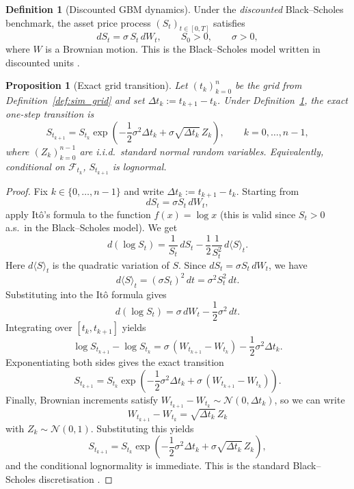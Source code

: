 \documentclass[12pt,a4paper]{article}
\theoremstyle{definition}
\newtheorem{definition}{Definition}[section]
\theoremstyle{plain}
\newtheorem{proposition}{Proposition}[section]
\theoremstyle{remark}
\theoremstyle{plain}
\begin{document}
\begin{definition}[Discounted GBM dynamics]
\label{def:gbm_discounted}
Under the \emph{discounted} Black--Scholes benchmark, the asset price process $(S_t)_{t\in[0,T]}$ satisfies
\[
dS_t = \sigma\, S_t\, dW_t,
\qquad S_0>0,
\qquad \sigma>0,
\]
where $W$ is a Brownian motion. This is the Black--Scholes model written in discounted units \cite{BlackScholes1973}.
\end{definition}

\begin{proposition}[Exact grid transition]
\label{prop:gbm_exact_transition}
Let $(t_k)_{k=0}^n$ be the grid from Definition~\ref{def:sim_grid} and set $\Delta t_k:=t_{k+1}-t_k$. 
Under Definition~\ref{def:gbm_discounted}, the exact one-step transition is
\[
S_{t_{k+1}}
=
S_{t_k}\exp\!\left(-\frac{1}{2}\sigma^2\Delta t_k+\sigma\sqrt{\Delta t_k}\,Z_k\right),
\qquad k=0,\dots,n-1,
\]
where $(Z_k)_{k=0}^{n-1}$ are i.i.d.\ standard normal random variables.
Equivalently, conditional on $\mathcal{F}_{t_k}$, $S_{t_{k+1}}$ is lognormal.
\end{proposition}

\begin{proof}
Fix $k\in\{0,\dots,n-1\}$ and write $\Delta t_k:=t_{k+1}-t_k$. Starting from
\[
dS_t=\sigma S_t\,dW_t,
\]
apply It\^o's formula to the function $f(x)=\log x$ (this is valid since $S_t>0$ a.s.\ in the Black--Scholes model). We get
\[
d(\log S_t)=\frac{1}{S_t}\,dS_t-\frac{1}{2}\frac{1}{S_t^2}\,d\langle S\rangle_t.
\]
Here $d\langle S\rangle_t$ is the quadratic variation of $S$. Since $dS_t=\sigma S_t\,dW_t$, we have
\[
d\langle S\rangle_t = (\sigma S_t)^2\,dt=\sigma^2 S_t^2\,dt.
\]
Substituting into the It\^o formula gives
\[
d(\log S_t)=\sigma\,dW_t-\frac12\sigma^2\,dt.
\]
Integrating over $[t_k,t_{k+1}]$ yields
\[
\log S_{t_{k+1}}-\log S_{t_k}
=
\sigma\,(W_{t_{k+1}}-W_{t_k})-\frac12\sigma^2\Delta t_k.
\]
Exponentiating both sides gives the exact transition
\[
S_{t_{k+1}}
=
S_{t_k}\exp\!\left(-\frac12\sigma^2\Delta t_k+\sigma\,(W_{t_{k+1}}-W_{t_k})\right).
\]
Finally, Brownian increments satisfy $W_{t_{k+1}}-W_{t_k}\sim\mathcal N(0,\Delta t_k)$, so we can write
\[
W_{t_{k+1}}-W_{t_k}=\sqrt{\Delta t_k}\,Z_k
\]
with $Z_k\sim\mathcal N(0,1)$. Substituting this yields
\[
S_{t_{k+1}}
=
S_{t_k}\exp\!\left(-\frac12\sigma^2\Delta t_k+\sigma\sqrt{\Delta t_k}\,Z_k\right),
\]
and the conditional lognormality is immediate. This is the standard Black--Scholes discretisation \cite{BlackScholes1973}.
\end{proof}
\end{document}
